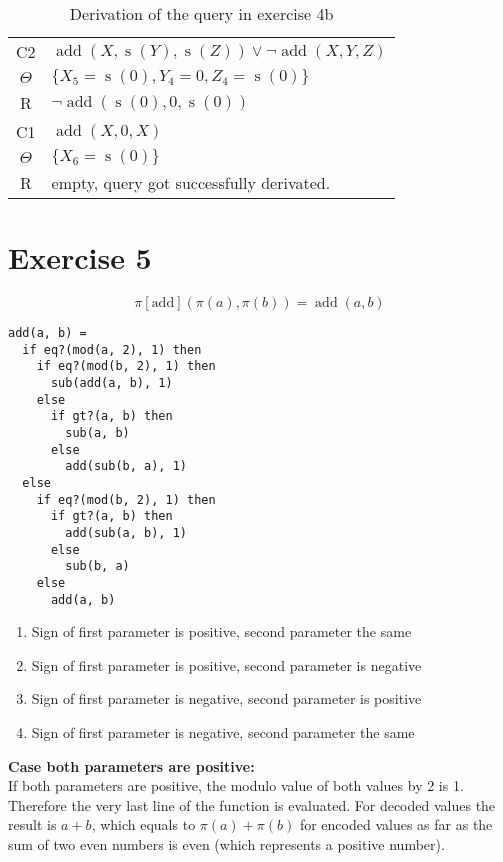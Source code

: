 \documentclass[11pt]{article}
\DeclareMathOperator*{\s}{s}
\DeclareMathOperator*{\add}{add}
\begin{document}
\begin{table}[h]
\begin{tabular}{cl}
    C2  & $\add(X, \s(Y), \s(Z)) \lor \neg \add(X, Y, Z)$ \\
    $\Theta$ & $\{ X_5 = \s(0), Y_4 = 0, Z_4 = \s(0) \}$ \\
    R   & $\neg \add(\s(0), 0, \s(0))$ \\[10pt]%

    C1  & $\add(X, 0, X)$ \\
    $\Theta$ & $\{ X_6 = \s(0) \}$ \\
    R   & empty, query got successfully derivated. \\
  \end{tabular}
  \caption{Derivation of the query in exercise 4b}
  \label{tab:4b-deriv}
\end{table}
%
\section{Exercise 5}
%
\[
  \pi[\text{add}](\pi(a), \pi(b)) = \operatorname{add}(a, b)
\]
%
\lstset{language=EXP}
\begin{lstlisting}
add(a, b) =
  if eq?(mod(a, 2), 1) then
    if eq?(mod(b, 2), 1) then
      sub(add(a, b), 1)
    else
      if gt?(a, b) then
        sub(a, b)
      else
        add(sub(b, a), 1)
  else
    if eq?(mod(b, 2), 1) then
      if gt?(a, b) then
        add(sub(a, b), 1)
      else
        sub(b, a)
    else
      add(a, b)
\end{lstlisting}

\begin{enumerate}
  \item Sign of first parameter is positive, second parameter the same
  \item Sign of first parameter is positive, second parameter is negative
  \item Sign of first parameter is negative, second parameter is positive
  \item Sign of first parameter is negative, second parameter the same
\end{enumerate}

\textbf{Case both parameters are positive:} \\
If both parameters are positive, the modulo value of both values by 2 is 1.
Therefore the very last line of the function is evaluated. For decoded
values the result is $a+b$, which equals to $\pi(a) + \pi(b)$ for encoded
values as far as the sum of two even numbers is even (which represents
a positive number).
\end{document}
